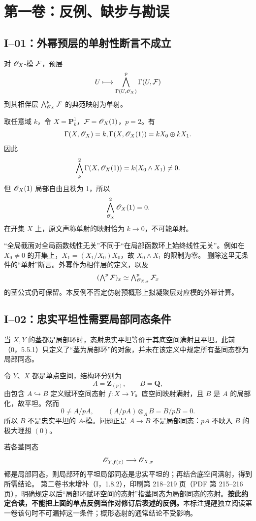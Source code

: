 \chapter{第一卷：反例、缺步与勘误}
\section{I--01：外幂预层的单射性断言不成立}
对 $\mathscr O_X$-模 $\mathcal F$，预层
\[
 U\longmapsto\bigwedge_{\Gamma(U,\mathscr O_X)}^p\Gamma(U,\mathcal F)
\]
到其相伴层 $\bigwedge^p_{\mathscr O_X}\mathcal F$ 的典范映射为单射。
\begin{analysisproof}
取任意域 $k$，令 $X=\mathbf P^1_k$，$\mathcal F=\mathscr O_X(1)$，$p=2$。有
\[
\Gamma(X,\mathscr O_X)=k,
\Gamma(X,\mathscr O_X(1))=kX_0\oplus kX_1.
\]
因此
\[
\bigwedge_k^2\Gamma(X,\mathscr O_X(1))=k(X_0\wedge X_1)\ne0.
\]
但 $\mathscr O_X(1)$ 局部自由且秩为 1，所以
\[
\bigwedge_{\mathscr O_X}^2\mathscr O_X(1)=0.
\]
在开集 $X$ 上，原文声称单射的映射恰为 $k\to0$，不可能单射。
\end{analysisproof}
“全局截面对全局函数线性无关”不同于“在局部函数环上始终线性无关”。例如在 $X_0\ne0$ 的开集上，$X_1=(X_1/X_0)X_0$，故 $X_0\wedge X_1$ 的限制为零。
删除这里无条件的“单射”断言。外幂作为相伴层的定义，以及
\[
(\textstyle\bigwedge^p\mathcal F)_x\simeq\bigwedge^p_{\mathscr O_{X,x}}\mathcal F_x
\]
的茎公式仍可保留。本反例不否定仿射预概形上拟凝聚层对应模的外幂计算。

\section{I--02：忠实平坦性需要局部同态条件}
当 $X,Y$ 的茎都是局部环时，态射忠实平坦等价于其底空间满射且平坦。此前（0，5.5.1）只定义了“茎为局部环”的对象，并未在该定义中规定所有茎同态都为局部同态。
\begin{analysisproof}
令 $Y$、$X$ 都是单点空间，结构环分别为
\[
A=\mathbf Z_{(p)},\qquad B=\mathbf Q,
\]
由包含 $A\hookrightarrow B$ 定义赋环空间态射 $f:X\to Y$。底空间映射满射，且 $B$ 是 $A$ 的局部化，故平坦。然而
\[
0\ne A/pA,\qquad (A/pA)\otimes_A B=B/pB=0.
\]
所以 $B$ 不是忠实平坦的 $A$-模。问题正是 $A\to B$ 不是局部同态：$pA$ 不映入 $B$ 的极大理想 $(0)$。
\end{analysisproof}
若各茎同态
\[
\mathscr O_{Y,f(x)}\longrightarrow\mathscr O_{X,x}
\]
都是局部同态，则局部环的平坦局部同态是忠实平坦的；再结合底空间满射，得到所需结论。
第二卷书末增补（I，1.8.2），印刷第 218--219 页（PDF 第 215--216 页），明确规定以后“局部环赋环空间的态射”指茎同态为局部同态的态射。\textbf{按此约定合读，不能把上面的单点反例当作对修订后表述的反例。}本标注提醒独立阅读第一卷该句时不可漏掉这一条件；概形态射的通常结论不受影响。

